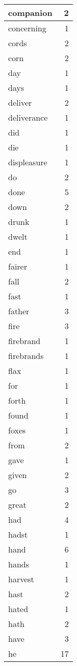 \begin{center}
\begin{longtable}{l|r}
companion & 2\\ \hline 
concerning & 1\\ \hline 
cords & 2\\ \hline 
corn & 2\\ \hline 
day & 1\\ \hline 
days & 1\\ \hline 
deliver & 2\\ \hline 
deliverance & 1\\ \hline 
did & 1\\ \hline 
die & 1\\ \hline 
displeasure & 1\\ \hline 
do & 2\\ \hline 
done & 5\\ \hline 
down & 2\\ \hline 
drunk & 1\\ \hline 
dwelt & 1\\ \hline 
end & 1\\ \hline 
fairer & 1\\ \hline 
fall & 2\\ \hline 
fast & 1\\ \hline 
father & 3\\ \hline 
fire & 3\\ \hline 
firebrand & 1\\ \hline 
firebrands & 1\\ \hline 
flax & 1\\ \hline 
for & 1\\ \hline 
forth & 1\\ \hline 
found & 1\\ \hline 
foxes & 1\\ \hline 
from & 2\\ \hline 
gave & 1\\ \hline 
given & 2\\ \hline 
go & 3\\ \hline 
great & 2\\ \hline 
had & 4\\ \hline 
hadst & 1\\ \hline 
hand & 6\\ \hline 
hands & 1\\ \hline 
harvest & 1\\ \hline 
hast & 2\\ \hline 
hated & 1\\ \hline 
hath & 2\\ \hline 
have & 3\\ \hline 
he & 17\\ \hline 

\end{longtable}
\end{center}
